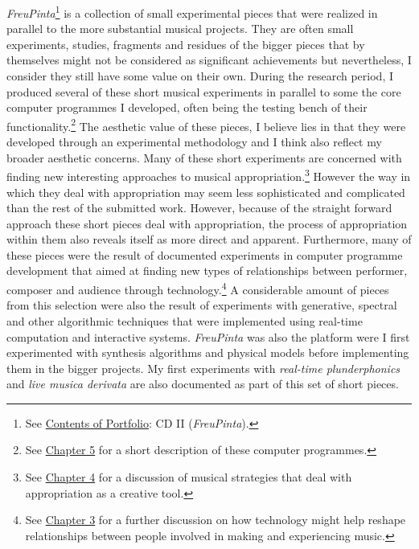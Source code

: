 \emph{FreuPinta}\footnote{See \hyperlink{portfolio}{Contents of Portfolio}: CD II (\emph{FreuPinta}).} is a collection of small experimental pieces that were realized in parallel to the more substantial musical projects. They are often small experiments, studies, fragments and residues of the bigger pieces that by themselves might not be considered as significant achievements but nevertheless, I consider they still have some value on their own. During the research period, I produced several of these short musical experiments in parallel to some the core computer programmes I developed, often being the testing bench of their functionality.\footnote{See \hyperlink{chapter5}{Chapter 5} for a short description of these computer programmes.} The aesthetic value of these pieces, I believe lies in that they were developed through an experimental methodology and I think also reflect my broader aesthetic concerns. Many of these short experiments are concerned with finding new interesting approaches to musical appropriation.\footnote{See \hyperlink{chapter4}{Chapter 4} for a discussion of musical strategies that deal with appropriation as a creative tool.} However the way in which they deal with appropriation may seem less sophisticated and complicated than the rest of the submitted work. However, because of the straight forward approach these short pieces deal with appropriation, the process of appropriation within them also reveals itself as more direct and apparent. Furthermore, many of these pieces were the result of documented experiments in computer programme development that aimed at finding new types of relationships between performer, composer and audience through technology.\footnote{See \hyperlink{chapter3}{Chapter 3} for a further discussion on how technology might help reshape relationships between people involved in making and experiencing music.} A considerable amount of pieces from this selection were also the result of experiments with generative, spectral and other algorithmic techniques that were implemented using real-time computation and interactive systems. \emph{FreuPinta} was also the platform were I first experimented with synthesis algorithms and physical models before implementing them in the bigger projects. My first experiments with \emph{real-time plunderphonics} and \emph{live musica derivata} are also documented as part of this set of short pieces. 

